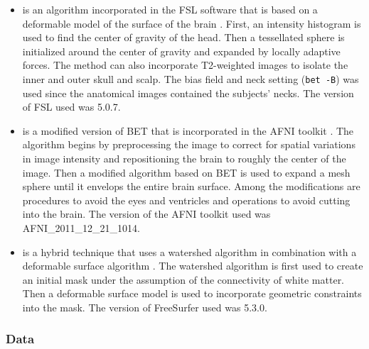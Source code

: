 \begin{itemize}
    \item \DIFdelbegin {}\DIFdelend \DIFaddbegin {}\DIFaddend is an algorithm incorporated in the FSL software that is based on a deformable model of the surface of the brain \cite{Smith2002}. First, an intensity histogram is used to find the center of gravity of the head. Then a tessellated sphere is initialized around the center of gravity and expanded by locally adaptive forces. The method can also incorporate T2-weighted images to isolate the inner and outer skull and scalp. The bias field and neck setting ({\tt bet -B}) was used since the anatomical images contained the subjects' necks. The version of FSL \DIFdelbegin {}\DIFdelend used was 5.0.7.

    \item \DIFdelbegin {}\DIFdelend \DIFaddbegin {}\DIFaddend is a modified version of BET that is incorporated in the AFNI toolkit \cite{afni}. The algorithm begins by preprocessing the image to correct for spatial variations in image intensity and repositioning the brain to roughly the center of the image. Then a modified algorithm based on BET is used to expand a mesh sphere until it envelops the entire brain surface. Among the modifications are procedures to avoid the eyes and ventricles and operations to avoid cutting into the brain. The version of the AFNI toolkit \DIFdelbegin {}\DIFdelend used was AFNI\_2011\_12\_21\_1014.

    \item \DIFdelbegin {}\DIFdelend \DIFaddbegin {}\DIFaddend is a hybrid technique that uses a watershed algorithm in combination with a deformable surface algorithm \cite{Segonne2004}. The watershed algorithm is first used to create an initial mask under the assumption of the connectivity of white matter. Then a deformable surface model is used to incorporate geometric constraints into the mask. The version of FreeSurfer \DIFdelbegin {}\DIFdelend used was 5.3.0.
\end{itemize}



\subsubsection*{Data \DIFdelbegin {}\DIFdelend \DIFaddbegin {}\DIFaddend }

